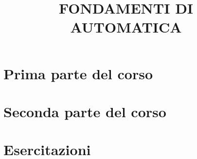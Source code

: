\documentclass[a4paper, 9pt]{article}
\title{FONDAMENTI DI AUTOMATICA}
\begin{document}
    \maketitle
    \tableofcontents{}
    \newpage
    \part{Prima parte del corso}
\begin{comment} -----------------------------------------------PRIMA PARTE
    
    
    
    
    
    
    
    
    
    
    
\end{comment}
    \newpage
    \part{Seconda parte del corso}
    
    
\begin{comment}
    
    
    
    
    
    
    
    
    
    
    
    
    
    
    
    
    
    
    
    
\end{comment}
    \newpage
    \part{Esercitazioni}
\begin{comment} -----------------------------------------------ESERCITAZIONI
    
    
    
    
    
    
    
\end{comment}
\end{document}
